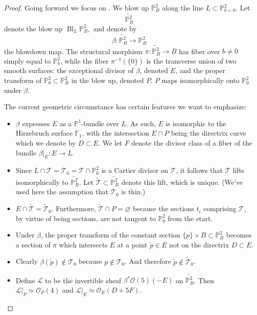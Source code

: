 \documentclass[reqno, 11pt]{amsart}
\theoremstyle{plain}
\theoremstyle{remark}
\renewcommand{\P}{\mathbb{P}}
\renewcommand{\O}{\mathcal{O}}
\DeclareMathOperator{\Bl}{Bl}
\begin{document}
\begin{proof}
    Going forward we focus on .  We blow up $\P^{2}_{B}$  along the line $L \subset \P^{2}_{b=0}$. Let $$\widetilde{\P^{2}_{B}}$$ denote the blow up $\Bl_{L} \P^{2}_{B},$ and denote by $$\beta: \widetilde{\P^{2}_{B}} \to \P^{2}_{B}$$ the blowdown map.  The structural morphism $\pi: \widetilde{\P^{2}_{B}} \to B$ has fiber over $b \neq 0$ simply equal to $\P^{2}_{b}$, while the fiber $\pi^{-1}(\{0\})$ is the transverse union of two smooth surfaces: the exceptional divisor of $\beta$, denoted $E$,  and the proper transform of $\P^{2}_{0} \subset \P^{2}_{B}$ in the blow up, denoted $P$. $P$ maps isomorphically onto $\P^{2}_{0}$ under $\beta$. 

    The current geometric circumstance has certain features we want to emphasize:
\begin{itemize}
\item $\beta$ expresses $E$ as a $\P^{1}$-bundle over $L$. As such, $E$ is isomorphic to the Hirzebruch surface $\mathbb{F}_{1}$, with the intersection $E \cap P$ being the directrix curve which we denote by $D \subset E$. We let $F$ denote the divisor class of a fiber of the bundle $\beta|_{E}: E \to L$.

\item Since $L \cap \mathcal{T} = \mathcal{T}_{0} = \mathcal{T} \cap \P^{2}_{0}$ is a Cartier divisor on $\mathcal{T}$, it follows that $\mathcal{T}$ lifts isomorphically to $\widetilde{\P^{2}_{B}}$.  Let $\widetilde{\mathcal{T}} \subset \widetilde{\P^{2}_{B}}$ denote this lift, which is unique. (We've used here the assumption that $\mathcal{T}_{0}$ is thin.)  

\item $E \cap \widetilde{\mathcal{T}} = \widetilde{\mathcal{T}}_{0}$. Furthermore, $\widetilde{\mathcal{T}} \cap P = \varnothing$ because the sections $t_{i}$ comprising $\mathcal{T}$, by virtue of being sections, are not tangent to $\P^{2}_{0}$ from the start. 

\item Under $\beta$, the proper transform of the constant section $\{p\} \times B \subset \P^{2}_{B}$ becomes a section of $\pi$ which intersects $E$ at a point $\widetilde{p} \in E$ not on the directrix $D \subset E$.  

\item Clearly $\beta(\widetilde{p}) \notin \mathcal{T}_{0}$ because $p \notin \mathcal{T}_{0}$. And therefore $\widetilde{p} \notin \widetilde{\mathcal{T}}_{0}$.

\item Define $\mathcal{L}$ to be the invertible sheaf $\beta^{*}\O(5)(-E)$ on $\widetilde{\P_{B}^{2}}$. Then $\mathcal{L}|_{P} \simeq \O_{P}(4)$ and $\mathcal{L}|_{E} \simeq \O_{E}(D+5F)$.
\end{itemize}


\end{proof}
\end{document}
